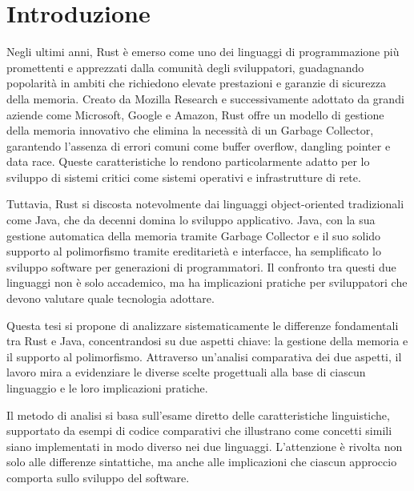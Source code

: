 
\chapter{Introduzione}
Negli ultimi anni, Rust è emerso come uno dei linguaggi di programmazione più promettenti e apprezzati dalla comunità degli sviluppatori, guadagnando popolarità in ambiti che richiedono elevate prestazioni e garanzie di sicurezza della memoria. Creato da Mozilla Research e successivamente adottato da grandi aziende come Microsoft, Google e Amazon, Rust offre un modello di gestione della memoria innovativo che elimina la necessità di un Garbage Collector, garantendo l'assenza di errori comuni come buffer overflow, dangling pointer e data race. Queste caratteristiche lo rendono particolarmente adatto per lo sviluppo di sistemi critici come sistemi operativi e infrastrutture di rete.

Tuttavia, Rust si discosta notevolmente dai linguaggi object-oriented tradizionali come Java, che da decenni domina lo sviluppo applicativo. Java, con la sua gestione automatica della memoria tramite Garbage Collector e il suo solido supporto al polimorfismo tramite ereditarietà e interfacce, ha semplificato lo sviluppo software per generazioni di programmatori. Il confronto tra questi due linguaggi non è solo accademico, ma ha implicazioni pratiche per sviluppatori che devono valutare quale tecnologia adottare.

Questa tesi si propone di analizzare sistematicamente le differenze fondamentali tra Rust e Java, concentrandosi su due aspetti chiave: la gestione della memoria e il supporto al polimorfismo. Attraverso un'analisi comparativa dei due aspetti, il lavoro mira a evidenziare le diverse scelte progettuali alla base di ciascun linguaggio e le loro implicazioni pratiche. 

Il metodo di analisi si basa sull'esame diretto delle caratteristiche linguistiche, supportato da esempi di codice comparativi che illustrano come concetti simili siano implementati in modo diverso nei due linguaggi. L'attenzione è rivolta non solo alle differenze sintattiche, ma anche alle implicazioni che ciascun approccio comporta sullo sviluppo del software.

